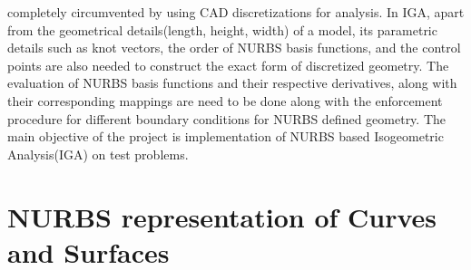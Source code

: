 \documentclass[submit,12pt]{aiaa-pretty} %
\begin{document}
completely circumvented by using CAD discretizations for analysis.
In IGA, apart from the
geometrical details(length, height, width) of a model, its parametric
details such as knot vectors, the order of NURBS basis functions, and
the control points are also needed to construct the exact form of
discretized geometry. The evaluation of NURBS basis functions and
their respective derivatives, along with their corresponding mappings
are need to be done along with the enforcement procedure for different
boundary conditions for NURBS defined geometry.
The main objective of the project is implementation of NURBS based
Isogeometric Analysis(IGA) on test problems.

\section{NURBS representation of Curves and Surfaces}
\end{document}
